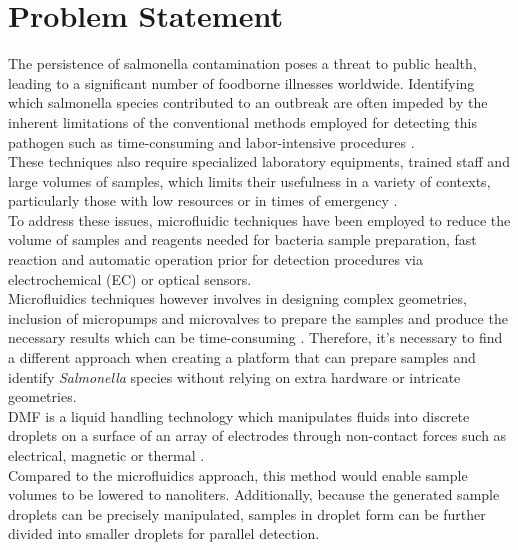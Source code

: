 \section{Problem Statement}
The persistence of salmonella contamination poses a threat to public health, leading to a significant number of foodborne illnesses worldwide. Identifying which salmonella species contributed to an outbreak are often impeded by the inherent limitations of the conventional methods employed for detecting this pathogen such as time-consuming and labor-intensive procedures \cite{silvaRecentDevelopmentsLateral2023}.\\

These techniques also require specialized laboratory equipments, trained staff and large volumes of samples, which limits their usefulness in a variety of contexts, particularly those with low resources or in times of emergency \cite{shenBiosensorsRapidDetection2021,wangOverviewRapidDetection2021}.\\

To address these issues, microfluidic techniques have been employed to reduce the volume of samples and reagents needed for bacteria sample preparation, fast reaction and automatic operation \cite{qiMicrofluidicBiosensorRapid2021,nguyenCompleteProtocolRapid2019} prior for detection procedures via electrochemical (EC) or optical sensors. \\

Microfluidics techniques however involves in designing complex geometries, inclusion of micropumps and microvalves to prepare the samples and produce the necessary results which can be time-consuming \cite{suMicrofluidicsBasedBiochipsTechnology2006}. Therefore, it's necessary to find a different approach when creating a platform that can prepare samples and identify \emph{Salmonella} species without relying on  extra hardware or intricate geometries.\\

DMF is a liquid handling technology which manipulates fluids into discrete droplets on a surface of an array of electrodes through non-contact forces such as electrical, magnetic or thermal \cite{nguyenCompleteProtocolRapid2019,qiMicrofluidicBiosensorRapid2021}.\\

Compared to the microfluidics approach, this method would enable sample volumes to be lowered to nanoliters. Additionally, because the generated sample droplets can be precisely manipulated, samples in droplet form can be further divided into smaller droplets for parallel detection.\\

